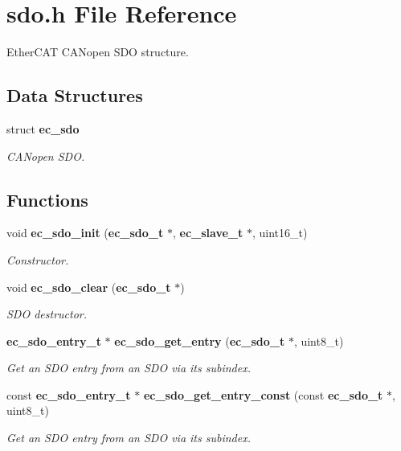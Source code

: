\section{sdo.\-h \-File \-Reference}
\label{sdo_8h}


\-Ether\-C\-A\-T \-C\-A\-Nopen \-S\-D\-O structure.  


\subsection*{\-Data \-Structures}
\begin{DoxyCompactItemize}
\item 
struct {\bf ec\-\_\-sdo}
\begin{DoxyCompactList}\small\item\em \-C\-A\-Nopen \-S\-D\-O. \end{DoxyCompactList}\end{DoxyCompactItemize}
\subsection*{\-Functions}
\begin{DoxyCompactItemize}
\item 
void {\bf ec\-\_\-sdo\-\_\-init} ({\bf ec\-\_\-sdo\-\_\-t} $\ast$, {\bf ec\-\_\-slave\-\_\-t} $\ast$, uint16\-\_\-t)\label{sdo_8h_ac99e87366c0031106442aa389ce7f228}

\begin{DoxyCompactList}\small\item\em \-Constructor. \end{DoxyCompactList}\item 
void {\bf ec\-\_\-sdo\-\_\-clear} ({\bf ec\-\_\-sdo\-\_\-t} $\ast$)
\begin{DoxyCompactList}\small\item\em \-S\-D\-O destructor. \end{DoxyCompactList}\item 
{\bf ec\-\_\-sdo\-\_\-entry\-\_\-t} $\ast$ {\bf ec\-\_\-sdo\-\_\-get\-\_\-entry} ({\bf ec\-\_\-sdo\-\_\-t} $\ast$, uint8\-\_\-t)
\begin{DoxyCompactList}\small\item\em \-Get an \-S\-D\-O entry from an \-S\-D\-O via its subindex. \end{DoxyCompactList}\item 
const {\bf ec\-\_\-sdo\-\_\-entry\-\_\-t} $\ast$ {\bf ec\-\_\-sdo\-\_\-get\-\_\-entry\-\_\-const} (const {\bf ec\-\_\-sdo\-\_\-t} $\ast$, uint8\-\_\-t)
\begin{DoxyCompactList}\small\item\em \-Get an \-S\-D\-O entry from an \-S\-D\-O via its subindex. \end{DoxyCompactList}\end{DoxyCompactItemize}


